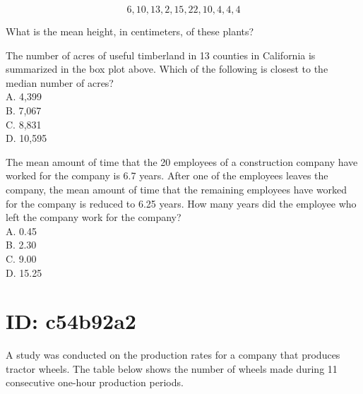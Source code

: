 $$
6,10,13,2,15,22,10,4,4,4
$$

What is the mean height, in centimeters, of these plants?

The number of acres of useful timberland in 13 counties in California is summarized in the box plot above. Which of the following is closest to the median number of acres?\\
A. 4,399\\
B. 7,067\\
C. 8,831\\
D. 10,595

The mean amount of time that the 20 employees of a construction company have worked for the company is 6.7 years. After one of the employees leaves the company, the mean amount of time that the remaining employees have worked for the company is reduced to 6.25 years. How many years did the employee who left the company work for the company?\\
A. 0.45\\
B. 2.30\\
C. 9.00\\
D. 15.25























\section*{ID: c54b92a2}
A study was conducted on the production rates for a company that produces tractor wheels. The table below shows the number of wheels made during 11 consecutive one-hour production periods.

